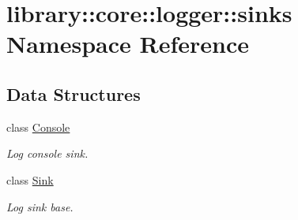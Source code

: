 \hypertarget{namespacelibrary_1_1core_1_1logger_1_1sinks}{}\section{library\+:\+:core\+:\+:logger\+:\+:sinks Namespace Reference}
\label{namespacelibrary_1_1core_1_1logger_1_1sinks}
\subsection*{Data Structures}
\begin{DoxyCompactItemize}
\item 
class \hyperlink{classlibrary_1_1core_1_1logger_1_1sinks_1_1Console}{Console}
\begin{DoxyCompactList}\small\item\em Log console sink. \end{DoxyCompactList}\item 
class \hyperlink{classlibrary_1_1core_1_1logger_1_1sinks_1_1Sink}{Sink}
\begin{DoxyCompactList}\small\item\em Log sink base. \end{DoxyCompactList}\end{DoxyCompactItemize}
